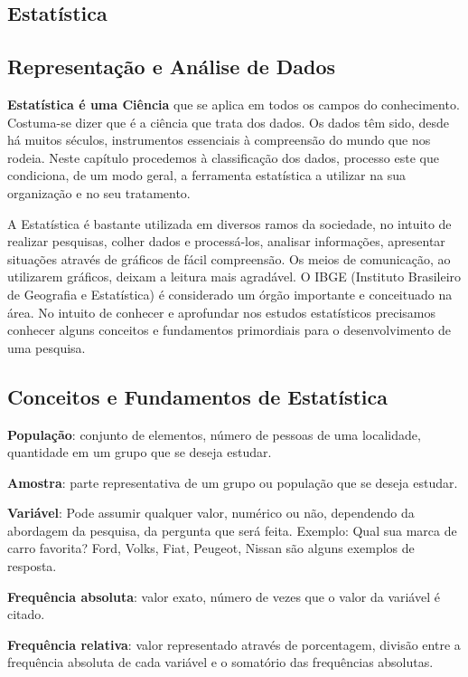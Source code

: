 \begin{multicols*}{2}
	
	
		
	\section*{Estatística}
	
	\subsection{Representação e Análise de Dados}
	\textbf{ Estatística é uma Ciência} que se aplica em todos os campos do conhecimento. Costuma-se dizer que é a ciência que trata dos dados. Os dados têm sido, desde há muitos séculos, instrumentos essenciais à compreensão do mundo que nos rodeia. Neste capítulo procedemos à classificação dos dados, processo este que condiciona, de um modo geral, a ferramenta estatística a utilizar na sua organização e no seu tratamento.
	
	A Estatística é bastante utilizada em diversos ramos da sociedade, no intuito de realizar pesquisas, colher dados e processá-los, analisar informações, apresentar situações através de gráficos de fácil compreensão. Os meios de comunicação, ao utilizarem gráficos, deixam a leitura mais agradável. O IBGE (Instituto Brasileiro de Geografia e Estatística) é considerado um órgão importante e conceituado na área. No intuito de conhecer e aprofundar nos estudos estatísticos precisamos conhecer alguns conceitos e fundamentos primordiais para o desenvolvimento de uma pesquisa.
	
\subsection{Conceitos e Fundamentos de Estatística}

\textbf{População}: conjunto de elementos, número de pessoas de uma localidade, quantidade em um grupo que se deseja estudar.

\textbf{Amostra}: parte representativa de um grupo ou população que se deseja estudar.

\textbf{Variável}: Pode assumir qualquer valor, numérico ou não, dependendo da abordagem da pesquisa, da pergunta que será feita. Exemplo: Qual sua marca de carro favorita? Ford, Volks, Fiat, Peugeot, Nissan são alguns exemplos de resposta.

\textbf{Frequência absoluta}: valor exato, número de vezes que o valor da variável é citado.

\textbf{Frequência relativa}: valor representado através de porcentagem, divisão entre a frequência absoluta de cada variável e o somatório das frequências absolutas.


\end{multicols*}
